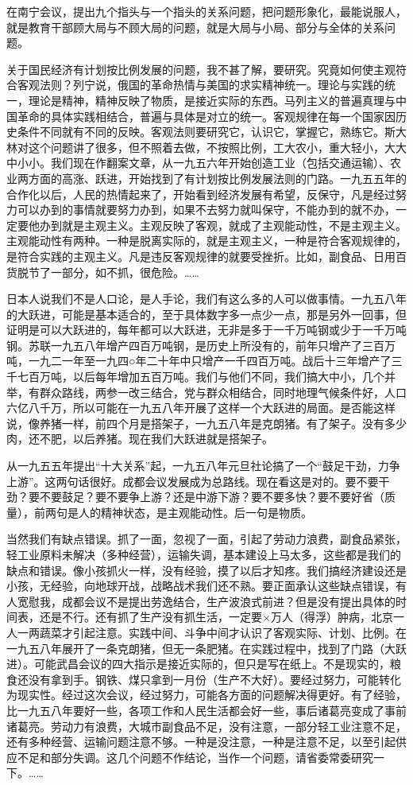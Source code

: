 在南宁会议，提出九个指头与一个指头的关系问题，把问题形象化，最能说服人，就是教育干部顾大局与不顾大局的问题，就是大局与小局、部分与全体的关系问题。

关于国民经济有计划按比例发展的问题，我不甚了解，要研究。究竟如何使主观符合客观法则？列宁说，俄国的革命热情与美国的求实精神统一。理论与实践的统一，理论是精神，精神反映了物质，是接近实际的东西。马列主义的普遍真理与中国革命的具体实践相结合，普遍与具体是对立的统一。客观规律在每一个国家因历史条件不同就有不同的反映。客观法则要研究它，认识它，掌握它，熟练它。斯大林对这个问题讲了很多，但不照着去做，不按照比例，工大农小，重大轻小，大大中小小。我们现在作翻案文章，从一九五六年开始创造工业（包括交通运输）、农业两方面的高涨、跃进，开始找到了有计划按比例发展法则的门路。一九五五年的合作化以后，人民的热情起来了，开始看到经济发展有希望，反保守，凡是经过努力可以办到的事情就要努力办到，如果不去努力就叫保守，不能办到的就不办，一定要他办到就是主观主义。主观反映了客观，就成了主观能动性，不是主观主义。主观能动性有两种。一种是脱离实际的，就是主观主义，一种是符合客观规律的，是符合实践的主观主义。凡是违反客观规律的就要受挫折。比如，副食品、日用百货脱节了一部分，如不抓，很危险。……

日本人说我们不是人口论，是人手论，我们有这么多的人可以做事情。一九五八年的大跃进，可能是基本适合的，至于具体数字多一点少一点，那是另外一回事，但证明是可以大跃进的，每年都可以大跃进，无非是多于一千万吨钢或少于一千万吨钢。苏联一九五八年增产四百万吨钢，是历史上所没有的，前年只增产了三百万吨，一九二一年至一九四○年二十年中只增产一千四百万吨。战后十三年增产了三千七百万吨，以后每年增加五百万吨。我们与他们不同，我们搞大中小，几个并举，有群众路线，两参一改三结合，党与群众相结合，同时地理气候条件好，人口六亿八千万，所以可能在一九五八年开展了这样一个大跃进的局面。是否能这样说，像养猪一样，前四个月是搭架子，一九五八年是克朗猪。有了架子。没有多少肉，还不肥，以后养猪。现在我们大跃进就是搭架子。

从一九五五年提出“十大关系”起，一九五八年元旦社论搞了一个“鼓足干劲，力争上游”。这两句话很好。成都会议发展成为总路线。现在看这是对的。要不要干劲？要不要鼓足？要不要争上游？还是中游下游？要不要多快？要不要好省（质量），前两句是人的精神状态，是主观能动性。后一句是物质。

当然我们有缺点错误。抓了一面，忽视了一面，引起了劳动力浪费，副食品紧张，轻工业原料未解决（多种经营），运输失调，基本建设上马太多，这些都是我们的缺点和错误。像小孩抓火一样，没有经验，摸了以后才知疼。我们搞经济建设还是小孩，无经验，向地球开战，战略战术我们还不熟。要正面承认这些缺点错误，有人宽慰我，成都会议不是提出劳逸结合，生产波浪式前进？但是没有提出具体的时间表，还是不行。还有抓了生产没有抓生活，一定要×万人（得浮）肿病，北京一人一两蔬菜才引起注意。实践中间、斗争中间才认识了客观实际、计划、比例。在一九五八年展开了一条克朗猪，但无一条肥猪。在实践过程中，找到了门路（大跃进）。可能武昌会议的四大指示是接近实际的，但只是写在纸上。不是现实的，粮食还没有拿到手。钢铁、煤只拿到一月份（生产不大好）。要经过努力，可能转化为现实性。经过这次会议，经过努力，可能各方面的问题解决得更好。有了经验，比一九五八年要好一些，各项工作和人民生活都会好一些，事后诸葛亮变成了事前诸葛亮。劳动力有浪费，大城市副食品不足，没有注意，一部分轻工业注意不足，还有多种经营、运输问题注意不够。一种是没注意，一种是注意不足，以至引起供应不足和部分失调。这几个问题不作结论，当作一个问题，请省委常委研究一下。……

